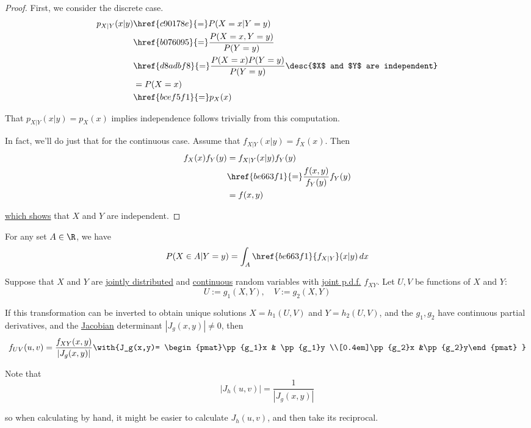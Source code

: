 \begin{proof}
  First, we consider the discrete case.
  \begin{align*}
    p_{X|Y}(x|y) &\href{c90178e}{=}P(X=x|Y=y)                                                    \\
                 &\href{b076095}{=}\frac{P(X=x,Y=y)}{P(Y=y)}                                     \\
                 &\href{d8adbf8}{=}\frac{P(X=x)P(Y=y)}{P(Y=y)}\desc{$X$ and $Y$ are independent} \\
                 &=P(X=x)                                                                        \\
                 &\href{bcef5f1}{=}p_X(x)
  \end{align*}

  That $p_{X|Y}(x|y)=p_X(x)$ implies independence follows trivially from this
  computation.

  In fact, we'll do just that for the continuous case. Assume that
  $f_{X|Y}(x|y)=f_X(x)$. Then
  \begin{align*}
    f_X(x)f_Y(y) &=f_{X|Y}(x|y)f_Y(y)                          \\
                 &\href{be663f1}{=}\frac{f(x,y)}{f_Y(y)}f_Y(y) \\
                 &=f(x,y)
  \end{align*}

  \href{d8adbf8}{which shows} that $X$ and $Y$ are independent.
\end{proof}

\label{fef9069}

For any set $A\in\R$, we have
$$
  P(X\in A|Y=y)=\int_A\href{be663f1}{f_{X|Y}}(x|y)\,dx
$$

\label{c39782e}

Suppose that $X$ and $Y$ are \href{ab5a852}{jointly distributed} and
\href{bdb1e15}{continuous} random variables with \href{b62ce9b}{joint p.d.f.}
$f_{XY}$. Let $U,V$ be functions of $X$ and $Y$:
$$
  U:=g_1(X,Y),\quad V:=g_2(X,Y)
$$

If this transformation can be inverted to obtain unique solutions $X=h_1(U,V)$
and $Y=h_2(U,V)$, and the $g_1,g_2$ have continuous partial derivatives, and
the \href{b648d41}{Jacobian} determinant $|J_g(x,y)|\neq0$, then
$$
  \def\pp#1#2{\frac{\partial #1}{\partial #2}}
  f_{UV}(u,v)=\frac{f_{XY}(x,y)}{|J_g(x,y)|}\with{J_g(x,y)=
    \begin{pmat}\pp{g_1}x & \pp{g_1}y \\[0.4em]\pp{g_2}x &\pp{g_2}y\end{pmat}
  }
$$

Note that
$$
  |J_h(u,v)|=\frac1{|J_g(x,y)|}
$$

so when calculating by hand, it might be easier to calculate $J_h(u,v)$, and
then take its reciprocal.
